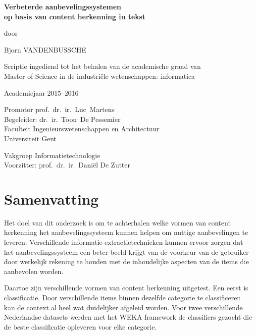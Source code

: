 
\newpage

{
\setlength{\baselineskip}{14pt}
\setlength{\parindent}{0pt}
\setlength{\parskip}{8pt}

\begin{center}

\noindent \textbf{\huge
Verbeterde aanbevelingssystemen\\[8pt]op basis van content herkenning in tekst
}

door 

Bjorn VANDENBUSSCHE

Scriptie ingediend tot het behalen van de academische graad van\\ 
Master of Science in de industri\"ele wetenschappen: informatica

Academiejaar 2015--2016

Promotor prof.~dr.~ir.~Luc~Martens\\
Begeleider: dr.~ir.~Toon~De Pessemier\\

Faculteit Ingenieurswetenschappen en Architectuur\\
Universiteit Gent

Vakgroep Informatietechnologie\\
Voorzitter: prof.~dr.~ir.~Dani\"el De Zutter

\end{center}

\section*{Samenvatting}

Het doel van dit onderzoek is om te achterhalen welke vormen van content herkenning het aanbevelingssysteem kunnen helpen om nuttige aanbevelingen te leveren. Verschillende informatie-extractietechnieken kunnen ervoor zorgen dat het aanbevelingssysteem een beter beeld krijgt van de voorkeur van de gebruiker door werkelijk rekening te houden met de inhoudelijke aspecten van de items die aanbevolen worden.

Daartoe zijn verschillende vormen van content herkenning uitgetest. Een eerst is classificatie. Door verschillende items binnen dezelfde categorie te classificeren kan de context al heel wat duidelijker afgeleid worden. Voor twee verschillende Nederlandse datasets werden met het WEKA framework de classifiers gezocht die de beste classificatie opleveren voor elke categorie.

}
